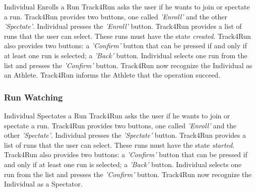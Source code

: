 \documentclass[a4paper]{article}
\begin{document}
        \begin{usecase}{Individual Enrolls a Run}
              {Track4Run asks the user if he wants to join or spectate a run. Track4Run provides two buttons, one called \textit{'Enroll'} and the other \textit{'Spectate'}.}
              {Individual presses the \textit{'Enroll'} button.}
              {Track4Run provides a list of runs that the user can select. These runs must have the state \textit{created}. Track4Run also provides two buttons: a \textit{'Confirm'} button that can be pressed if and only if at least one run is selected; a \textit{'Back'} button.}
              {Individual selects one run from the list and presses the \textit{'Confirm'} button.}
              {Track4Run now recognize the Individual as an Athlete.}
              {Track4Run informs the Athlete that the operation succeed.}
        \end{usecase}
        
        \subsubsection{Run Watching}
        
        \begin{usecase}{Individual Spectates a Run}
              {Track4Run asks the user if he wants to join or spectate a run. Track4Run provides two buttons, one called \textit{'Enroll'} and the other \textit{'Spectate'}.}
              {Individual presses the \textit{'Spectate'} button.}
              {Track4Run provides a list of runs that the user can select. These runs must have the state \textit{started}. Track4Run also provides two buttons: a \textit{'Confirm'} button that can be pressed if and only if at least one run is selected; a \textit{'Back'} button.}
              {Individual selects one run from the list and presses the \textit{'Confirm'} button.}
              {Track4Run now recognize the Individual as a Spectator.}
        \end{usecase}
    
\end{document}
